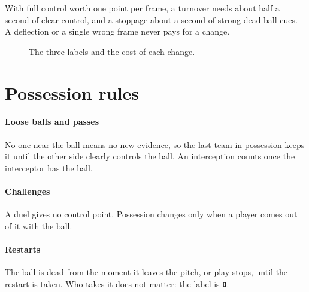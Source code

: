 \documentclass[11pt,a4paper]{article}
\newcommand{\lD}{\textcolor{colDtext}{\textbf{\texttt{D}}}}
\begin{document}
With full control worth one point per frame, a turnover needs about half a second of clear
control, and a stoppage about a second of strong dead-ball cues. A deflection or a single wrong
frame never pays for a change.

\begin{figure}[t]
\centering
{}
\caption{The three labels and the cost of each change.}\label{fig:states}
\end{figure}

\section{Possession rules}

\paragraph{Loose balls and passes} No one near the ball means no new evidence, so the last team
in possession keeps it until the other side clearly controls the ball. An interception counts once
the interceptor has the ball.

\paragraph{Challenges} A duel gives no control point. Possession changes only when a player comes
out of it with the ball.

\paragraph{Restarts} The ball is dead from the moment it leaves the pitch, or play stops, until
the restart is taken. Who takes it does not matter: the label is \lD.
\end{document}
